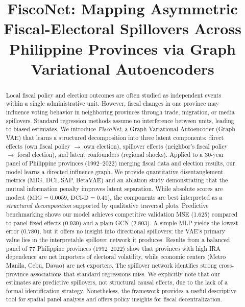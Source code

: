 \documentclass[conference]{IEEEtran}
\begin{document}
\title{FiscoNet: Mapping Asymmetric Fiscal-Electoral Spillovers Across Philippine Provinces via Graph Variational Autoencoders}

\author{
}

\maketitle

\begin{abstract}
Local fiscal policy and election outcomes are often studied as independent events within a single administrative unit. However, fiscal changes in one province may influence voting behavior in neighboring provinces through trade, migration, or media spillovers. Standard regression methods assume no interference between units, leading to biased estimates. We introduce \textit{FiscoNet}, a Graph Variational Autoencoder (Graph VAE) that learns a structured decomposition into three latent components: direct effects (own fiscal policy $\to$ own election), spillover effects (neighbor's fiscal policy $\to$ focal election), and latent confounders (regional shocks). Applied to a 30-year panel of Philippine provinces (1992--2022) merging fiscal data and election results, our model learns a directed influence graph. We provide quantitative disentanglement metrics (MIG, DCI, SAP, BetaVAE) and an ablation study demonstrating that the mutual information penalty improves latent separation. While absolute scores are modest ($\text{MIG}=0.0059$, $\text{DCI-D}=0.41$), the components are best interpreted as a \textit{structured decomposition} supported by qualitative traversal plots. Predictive benchmarking shows our model achieves competitive validation MSE (1.625) compared to panel fixed effects (0.930) and a plain GCN (2.803). A simple MLP yields the lowest error (0.780), but it offers no insight into directional spillovers; the VAE’s primary value lies in the interpretable spillover network it produces. Results from a balanced panel of 77 Philippine provinces (1992--2022) show that provinces with high IRA dependence are net importers of electoral volatility, while economic centers (Metro Manila, Cebu, Davao) are net exporters. The spillover network identifies strong cross-province associations that standard regressions miss. We explicitly note that our estimates are predictive spillovers, not structural causal effects, due to the lack of a formal identification strategy. Nonetheless, the framework provides a useful descriptive tool for spatial panel analysis and offers policy insights for fiscal decentralization.
\end{abstract}
\end{document}
